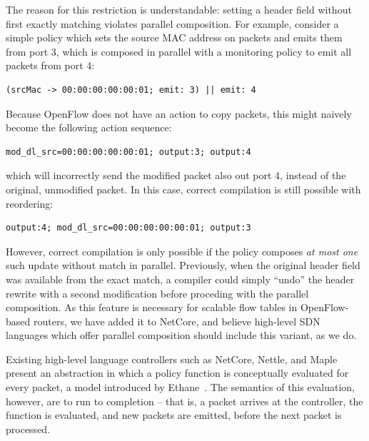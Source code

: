 The reason for this restriction is understandable: setting a header field without
first exactly matching violates parallel composition. For example, consider
a simple policy which sets the source MAC address on packets and emits them
from port 3, which is composed in parallel with a monitoring policy to emit
all packets from port 4:

\begin{small}
\begin{verbatim}
(srcMac -> 00:00:00:00:00:01; emit: 3) || emit: 4
\end{verbatim}
\end{small}
Because OpenFlow does not have an action to copy packets, this might
naively become the following action sequence:

\begin{small}
\begin{verbatim}
mod_dl_src=00:00:00:00:00:01; output:3; output:4
\end{verbatim}
\end{small}
which will incorrectly send the modified packet also out port 4, instead of the original,
unmodified packet. In this case, correct compilation is still possible with reordering:

\begin{small}
\begin{verbatim}
output:4; mod_dl_src=00:00:00:00:00:01; output:3
\end{verbatim}
\end{small}
However, correct compilation is only possible if the policy composes
\emph{at most one} such update without match in parallel. Previously, when the original
header field was available from the exact match, a compiler could simply
``undo'' the header rewrite with a second modification before proceding with the parallel composition.
As this feature is necessary for scalable flow tables in OpenFlow-based routers,
we have added it to NetCore, and believe
high-level SDN languages which offer parallel composition should include this
variant, as we do.

Existing high-level language controllers such as NetCore, Nettle, and Maple present
an abstraction in which a policy function is conceptually evaluated for every packet,
a model introduced by Ethane~\cite{Casado07Ethane}. The semantics of this evaluation,
however, are to run to completion -- that is, a packet arrives at the controller, the
function is evaluated, and new packets are emitted, before the next packet is processed.

